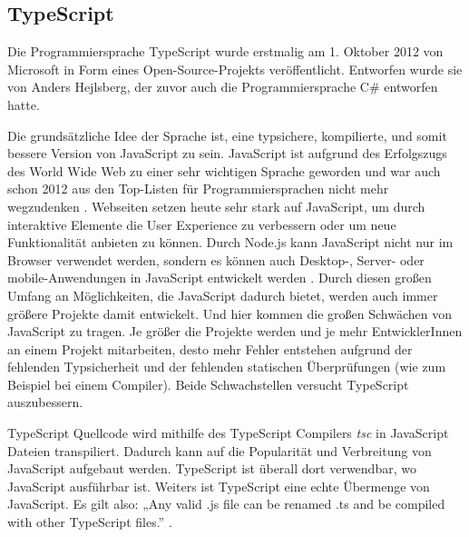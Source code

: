 \subsection{TypeScript}

Die Programmiersprache TypeScript wurde erstmalig am 1. Oktober 2012 
\cite{TypeScriptCodePlexArchived} von 
Microsoft in Form eines Open-Source-Projekts veröffentlicht. Entworfen wurde sie 
von Anders Hejlsberg, der zuvor auch die Programmiersprache C\# entworfen hatte. 

Die grundsätzliche Idee der Sprache ist, eine typsichere, kompilierte, und somit 
bessere Version von JavaScript zu sein. JavaScript ist aufgrund des Erfolgszugs
des World Wide Web zu einer sehr wichtigen Sprache geworden und war auch schon 2012 
aus den Top-Listen für Programmiersprachen nicht mehr wegzudenken 
\cite{StackOverflowSurvey,TIOBEIndex,PYPL}. 
Webseiten setzen heute sehr stark auf JavaScript, um durch interaktive Elemente 
die User Experience zu verbessern oder um neue Funktionalität anbieten zu können. 
Durch Node.js kann JavaScript nicht nur im Browser 
verwendet werden, sondern es können auch Desktop-, Server- oder mobile-Anwendungen 
in JavaScript entwickelt werden \cite{rozentals2017mastering}.
Durch diesen großen Umfang an Möglichkeiten, die 
JavaScript dadurch bietet, werden auch immer größere Projekte damit entwickelt. 
Und hier kommen die großen Schwächen von JavaScript zu tragen. 
Je größer die Projekte werden und je mehr EntwicklerInnen an einem Projekt 
mitarbeiten, desto mehr Fehler entstehen aufgrund der fehlenden Typsicherheit
und der fehlenden statischen Überprüfungen (wie zum Beispiel bei einem Compiler). 
Beide Schwachstellen versucht TypeScript auszubessern.

TypeScript Quellcode wird mithilfe des TypeScript Compilers \emph{tsc} in JavaScript 
Dateien transpiliert. Dadurch kann auf die Popularität und Verbreitung von JavaScript 
aufgebaut werden. TypeScript ist überall dort verwendbar, wo JavaScript 
ausführbar ist. Weiters ist TypeScript eine echte Übermenge von JavaScript. 
Es gilt also: „Any valid .js file can be renamed .ts and be compiled with other 
TypeScript files.” \cite{MaharryDanTR}. 

